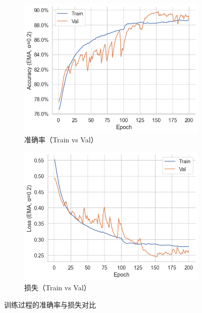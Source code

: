 \documentclass[a4paper,12pt]{article}
\begin{document}
\begin{figure}[htb]
  \centering
  \begin{subfigure}{0.48\linewidth}
    \centering
    \includegraphics[width=\linewidth]{images_in_paper/acc_train_val.png}
    \caption{准确率（Train vs Val）}
    \label{fig:acc}
  \end{subfigure}\hfill
  \begin{subfigure}{0.48\linewidth}
    \centering
    \includegraphics[width=\linewidth]{images_in_paper/loss_train_val.png}
    \caption{损失（Train vs Val）}
    \label{fig:loss}
  \end{subfigure}
  \caption{训练过程的准确率与损失对比}
  \label{fig:acc-loss}
\end{figure}
\end{document}

